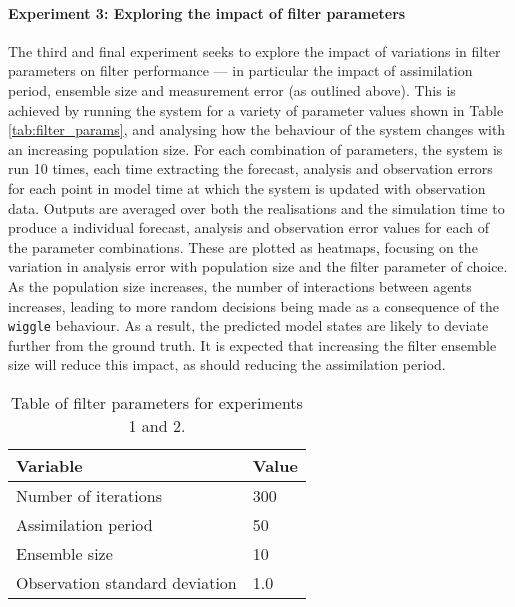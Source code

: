 \paragraph{Experiment 3: Exploring the impact of filter parameters}

The third and final experiment seeks to explore the impact of variations in
filter parameters on filter performance --- in particular the impact of
assimilation period, ensemble size and measurement error (as outlined above).
This is achieved by running the system for a variety of parameter values shown
in Table \ref{tab:filter_params}, and analysing how the behaviour of the system
changes with an increasing population size.
For each combination of parameters, the system is run 10 times, each time
extracting the forecast, analysis and observation errors for each point in model
time at which the system is updated with observation data.
Outputs are averaged over both the realisations and the simulation time to
produce a individual forecast, analysis and observation error values for each of
the parameter combinations.
These are plotted as heatmaps, focusing on the variation in analysis error with
population size and the filter parameter of choice.
As the population size increases, the number of interactions between agents
increases, leading to more random decisions being made as a consequence of the
\texttt{wiggle} behaviour.
As a result, the predicted model states are likely to deviate further from the
ground truth.
It is expected that increasing the filter ensemble size will reduce this impact,
as should reducing the assimilation period.

\begin{table}[!htb]
    \centering
    \begin{tabular}{@{}ll@{}}
        \toprule
        Variable                       & Value                         \\ \midrule
        Number of iterations           & 300                           \\
        Assimilation period            & 50                            \\
        Ensemble size                  & 10                            \\
        Observation standard deviation & 1.0                           \\ \bottomrule
    \end{tabular}
    \caption{Table of filter parameters for experiments
    1 and 2.}\label{tab:filter_params_12}
\end{table}

